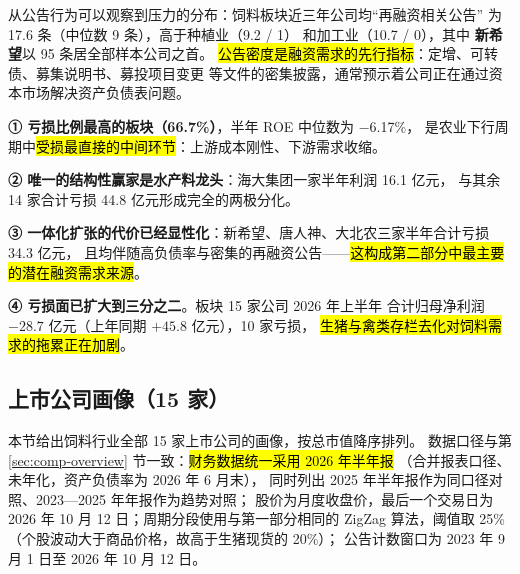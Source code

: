 从公告行为可以观察到压力的分布：饲料板块近三年公司均“再融资相关公告”
为 \num{17.6} 条（中位数 \num{9} 条），高于种植业（\num{9.2} / \num{1}）
和加工业（\num{10.7} / \num{0}），其中 \textbf{新希望}以 \num{95} 条居全部样本公司之首。
\hl{公告密度是融资需求的先行指标}：定增、可转债、募集说明书、募投项目变更
等文件的密集披露，通常预示着公司正在通过资本市场解决资产负债表问题。

\begin{keybox}[饲料行业的画像结论]
\normalsize
\textbf{① 亏损比例最高的板块（\num{66.7}\%）}，半年 ROE 中位数为 \num{-6.17}\%，
是农业下行周期中\hl{受损最直接的中间环节}：上游成本刚性、下游需求收缩。\par\vspace{3pt}
\textbf{② 唯一的结构性赢家是水产料龙头}：海大集团一家半年利润 \num{16.1} 亿元，
与其余 \num{14} 家合计亏损 \num{44.8} 亿元形成完全的两极分化。\par\vspace{3pt}
\textbf{③ 一体化扩张的代价已经显性化}：新希望、唐人神、大北农三家半年合计亏损 \num{34.3} 亿元，
且均伴随高负债率与密集的再融资公告——\hl{这构成第二部分中最主要的潜在融资需求来源}。\par\vspace{3pt}
\textbf{④ 亏损面已扩大到三分之二}。板块 \num{15} 家公司 2026 年上半年
合计归母净利润 $-28.7$ 亿元（上年同期 $+45.8$ 亿元），\num{10} 家亏损，
\hl{生猪与禽类存栏去化对饲料需求的拖累正在加剧}。
\end{keybox}

\subsection{上市公司画像（\num{15} 家）}
\label{sec:co-feed}

本节给出饲料行业全部 \num{15} 家上市公司的画像，按总市值降序排列。
数据口径与第 \ref{sec:comp-overview} 节一致：\hl{财务数据统一采用 2026 年半年报}
（合并报表口径、未年化，资产负债率为 2026 年 6 月末），
同时列出 2025 年半年报作为同口径对照、2023---2025 年年报作为趋势对照；
股价为月度收盘价，最后一个交易日为 2026 年 10 月 12 日；周期分段使用与第一部分相同的
ZigZag 算法，阈值取 25\%（个股波动大于商品价格，故高于生猪现货的 20\%）；
公告计数窗口为 2023 年 9 月 1 日至 2026 年 10 月 12 日。

